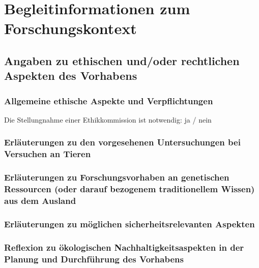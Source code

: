 \documentclass[ngerman]{scrartcl}
\begin{document}
\section{Begleitinformationen zum Forschungskontext}

\subsection{Angaben zu ethischen und/oder rechtlichen Aspekten des Vorhabens}

\subsubsection{Allgemeine ethische Aspekte und Verpflichtungen}
Die Stellungnahme einer Ethikkommission ist notwendig: ja / nein

\subsubsection{Erläuterungen zu den vorgesehenen Untersuchungen bei Versuchen an Tieren}

\subsubsection{Erläuterungen zu Forschungsvorhaben an genetischen Ressourcen (oder darauf bezogenem traditionellem Wissen) aus dem Ausland}

\subsubsection{Erläuterungen zu möglichen sicherheitsrelevanten Aspekten}



\subsubsection{Reflexion zu ökologischen Nachhaltigkeitsaspekten in der Planung und Durchführung des Vorhabens}

\end{document}
